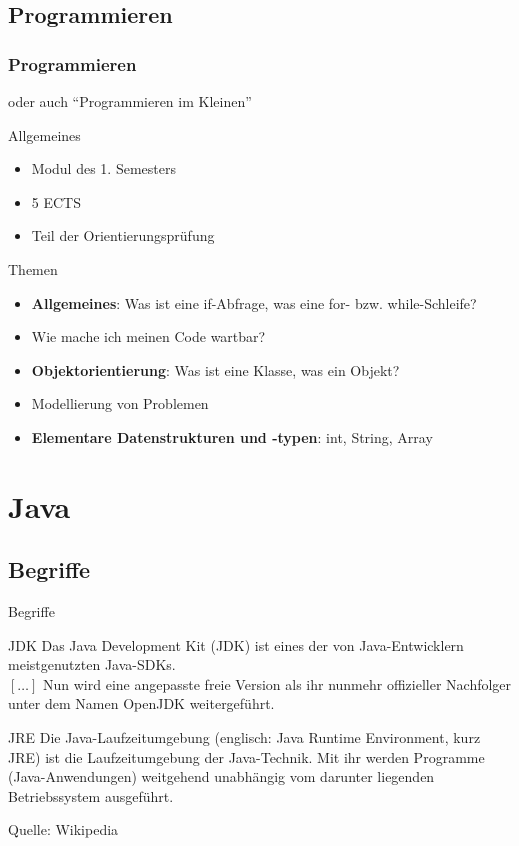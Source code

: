 \documentclass[usepdftitle=false,hyperref={pdfpagelabels=false}]{beamer}
\begin{document}
\subsection{Programmieren}
\begin{frame}
    \frametitle{Programmieren}
    oder auch "`Programmieren im Kleinen"'
    \begin{block}{Allgemeines}
      \begin{itemize}
        \item Modul des 1. Semesters
        \item 5 ECTS
        \item Teil der Orientierungsprüfung
      \end{itemize}
    \end{block}
    \begin{block}{Themen}
      \begin{itemize}
        \item \textbf{Allgemeines}: Was ist eine if-Abfrage, was eine for- bzw. while-Schleife?
        \item Wie mache ich meinen Code wartbar?
        \item \textbf{Objektorientierung}: Was ist eine Klasse, was ein Objekt?
        \item Modellierung von Problemen
        \item \textbf{Elementare Datenstrukturen und -typen}: int, String, Array
      \end{itemize}
    \end{block}
\end{frame}

\section{Java}
\subsection{Begriffe}
\begin{frame}{Begriffe}
    \begin{block}{JDK}
        Das Java Development Kit (JDK) ist eines der von
        Java-Entwicklern meistgenutzten Java-SDKs.\\
        $[\dots]$ Nun wird eine angepasste freie Version als ihr nunmehr
        offizieller Nachfolger unter dem Namen OpenJDK weitergeführt.
    \end{block}

    \begin{block}{JRE}
        Die Java-Laufzeitumgebung (englisch: Java Runtime Environment, kurz JRE)
        ist die Laufzeitumgebung der Java-Technik. Mit ihr werden
        Programme (Java-Anwendungen) weitgehend unabhängig vom
        darunter liegenden Betriebssystem ausgeführt.
    \end{block}

    Quelle: Wikipedia
\end{frame}
\end{document}
